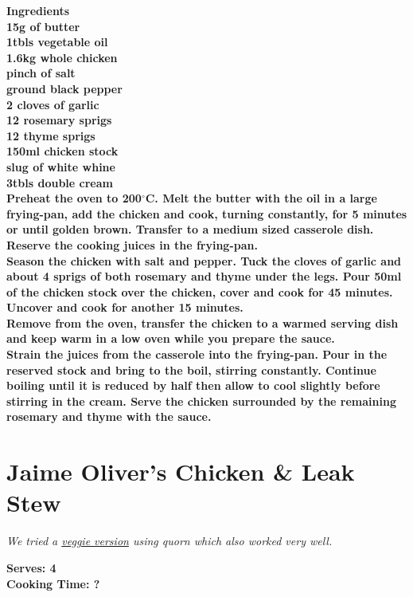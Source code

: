 \documentclass[18pt, oneside]{book}
\begin{document}
\bf{Ingredients} \normalfont \\
15g of butter \\
1tbls vegetable oil \\
1.6kg whole chicken \\
pinch of salt \\
ground black pepper \\
2 cloves of garlic \\
12 rosemary sprigs \\
12 thyme sprigs \\
150ml chicken stock \\
slug of white whine \\
3tbls double cream \\

Preheat the oven to 200$^\circ$C. Melt the butter with the oil in a large frying-pan, add the chicken and cook, turning constantly, for 5 minutes or until golden brown. Transfer to a medium sized casserole dish. Reserve the cooking juices in the frying-pan. \\

Season the chicken with salt and pepper. Tuck the cloves of garlic and about 4 sprigs of both rosemary and thyme under the legs. Pour 50ml of the chicken stock over the chicken, cover and cook for 45 minutes. Uncover and cook for another 15 minutes. \\

Remove from the oven, transfer the chicken to a warmed serving dish and keep warm in a low oven while you prepare the sauce. \\

Strain the juices from the casserole into the frying-pan. Pour in the reserved stock and bring to the boil, stirring constantly. Continue boiling until it is reduced by half then allow to cool slightly before stirring in the cream. Serve the chicken surrounded by the remaining rosemary and thyme with the sauce. \\

\section{Jaime Oliver's Chicken \& Leak Stew}

\textit{We tried a \hyperref[vegversion]{veggie version} using quorn which also worked very well. \\ }

\textbf{Serves: 4} \\
\textbf{Cooking Time: ?} \\ 
\end{document}
